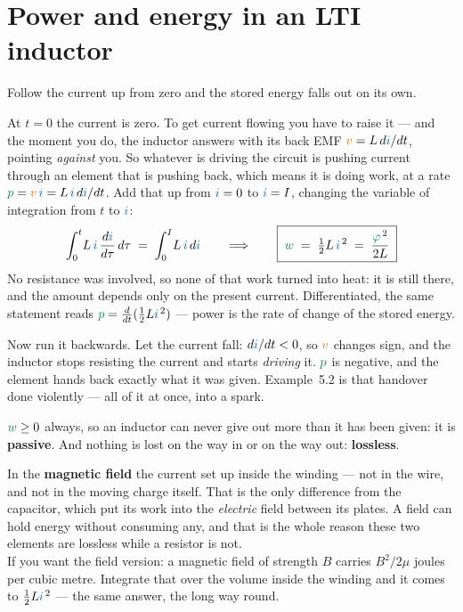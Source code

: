 \documentclass[11pt,a4paper]{article}
\newcommand{\Icol}[1]{\textcolor{ccur}{#1}}
\newcommand{\Vcol}[1]{\textcolor{cvolt}{#1}}
\newcommand{\Pcol}[1]{\textcolor{cpow}{#1}}
\newcommand{\Fcol}[1]{\textcolor{cflux}{#1}}
\begin{document}
\section{Power and energy in an LTI inductor}
\label{sec:energy}

Follow the current up from zero and the stored energy falls out on its own.

At $t = 0$ the current is zero. To get current flowing you have to raise it --- and the
moment you do, the inductor answers with its back EMF $\Vcol{v} = L\,d\Icol{i}/dt$,
pointing \emph{against} you. So whatever is driving the circuit is pushing current through
an element that is pushing back, which means it is doing work, at a rate
$\Pcol{p} = \Vcol{v}\,\Icol{i} = L\,\Icol{i}\,d\Icol{i}/dt$. Add that up from
$\Icol{i} = 0$ to $\Icol{i} = I$, changing the variable of integration from $t$ to
$\Icol{i}$:
\[
  \int_0^{t}\! L\,\Icol{i}\,\frac{d\Icol{i}}{d\tau}\,d\tau
  \;=\; \int_0^{I}\! L\,\Icol{i}\,d\Icol{i}
  \qquad\Longrightarrow\qquad
  \boxed{\;\Pcol{w} \;=\; \tfrac12 L\,\Icol{i}^{\,2}
    \;=\; \frac{\Fcol{\varphi}^{\,2}}{2L}\;}
\]
No resistance was involved, so none of that work turned into heat: it is still there, and
the amount depends only on the present current. Differentiated, the same statement reads
$\Pcol{p} = \frac{d}{dt}(\tfrac12 L\Icol{i}^{\,2})$ --- power is the rate of change of the
stored energy.

Now run it backwards. Let the current fall: $d\Icol{i}/dt < 0$, so $\Vcol{v}$ changes sign,
and the inductor stops resisting the current and starts \emph{driving} it. $\Pcol{p}$ is
negative, and the element hands back exactly what it was given. Example~5.2 is that
handover done violently --- all of it at once, into a spark.

$\Pcol{w} \ge 0$ always, so an inductor can never give out more than it has been given: it
is \textbf{passive}. And nothing is lost on the way in or on the way out:
\textbf{lossless}.

\begin{ideabox}
In the \textbf{magnetic field} the current set up inside the winding --- not in the wire, and
not in the moving charge itself. That is the only difference from the capacitor, which put
its work into the \emph{electric} field between its plates. A field can hold energy without
consuming any, and that is the whole reason these two elements are lossless while a
resistor is not.\\[3pt]
{\small If you want the field version: a magnetic field of strength $B$ carries $B^2/2\mu$
joules per cubic metre. Integrate that over the volume inside the winding and it comes to
$\tfrac12 L\Icol{i}^{\,2}$ --- the same answer, the long way round.}
\end{ideabox}
\end{document}
